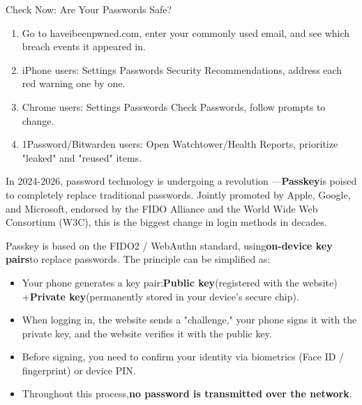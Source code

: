 \begin{tcbpractice}{Check Now: Are Your Passwords Safe?}
\begin{enumerate}
  \item Go to haveibeenpwned.com, enter your commonly used email, and see which breach events it appeared in.
  \item iPhone users: Settings Passwords Security Recommendations, address each red warning one by one.
  \item Chrome users: Settings Passwords Check Passwords, follow prompts to change.
  \item 1Password/Bitwarden users: Open Watchtower/Health Reports, prioritize "leaked" and "reused" items.
\end{enumerate}

\end{tcbpractice}


In 2024-2026, password technology is undergoing a revolution —\textbf{Passkey}is poised to completely replace traditional passwords. Jointly promoted by Apple, Google, and Microsoft, endorsed by the FIDO Alliance and the World Wide Web Consortium (W3C), this is the biggest change in login methods in decades.


Passkey is based on the FIDO2 / WebAuthn standard, using\textbf{on-device key pairs}to replace passwords. The principle can be simplified as:

\begin{itemize}
  \item Your phone generates a key pair:\textbf{Public key}(registered with the website) +\textbf{Private key}(permanently stored in your device's secure chip).
  \item When logging in, the website sends a "challenge," your phone signs it with the private key, and the website verifies it with the public key.
  \item Before signing, you need to confirm your identity via biometrics (Face ID / fingerprint) or device PIN.
  \item Throughout this process,\textbf{no password is transmitted over the network}.
\end{itemize}


